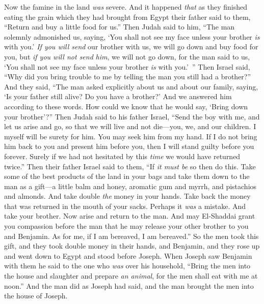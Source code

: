 \begin{biblechapter} %
 Now the famine in the land \textit{was} severe.
\verse And it happened \textit{that} as they finished eating the grain which they had brought from Egypt their father said to them, “Return and buy a little food for us.”
\verse Then Judah said to him, “The man solemnly admonished us, saying, ‘You shall not see my face unless your brother \textit{is} with you.’
\verse \textit{If you will send} our brother with us, we will go down and buy food for you,
\verse but \textit{if you will not send} \textit{him}, we will not go down, for the man said to us, ‘You shall not see my face unless your brother \textit{is} with you.’ ”
\verse Then Israel said, “Why did you bring trouble to me by telling the man you still had a brother?”
\verse And they said, “The man asked explicitly about us and about our family, saying, ‘Is your father still alive? Do you have a brother?’ And we answered him according to these words. How could we know that he would say, ‘Bring down your brother’?”
\verse Then Judah said to his father Israel, “Send the boy with me, and let us arise and go, so that we will live and not die—you, we, and our children.
\verse I myself will be surety for him. You may seek him from my hand. If I do not bring him back to you and present him before you, then I will stand guilty before you forever.
\verse Surely if we had not hesitated by this \textit{time} we would have returned twice.”
\verse Then their father Israel said to them, “If \textit{it must be} so then do this. Take some of the best products of the land in your bags and take them down to the man as a gift—a little balm and honey, aromatic gum and myrrh, and pistachios and almonds.
\verse And take double \textit{the} money in your hands. Take back the money that was returned in the mouth of your sacks. Perhaps it \textit{was} a mistake.
\verse And take your brother. Now arise and return to the man.
\verse And may El-Shaddai grant you compassion before the man that he may release your other brother to you and Benjamin. As for me, if I am bereaved, I am bereaved.”
\verse So the men took this gift, and they took double money in their hands, and Benjamin, and they rose up and went down to Egypt and stood before Joseph.
\verse When Joseph saw Benjamin with them he said to the one who \textit{was} over his household, “Bring the men into the house and slaughter and prepare \textit{an animal}, for the men shall eat with me at noon.”
\verse And the man did as Joseph had said, and the man brought the men into the house of Joseph.

\end{biblechapter}
